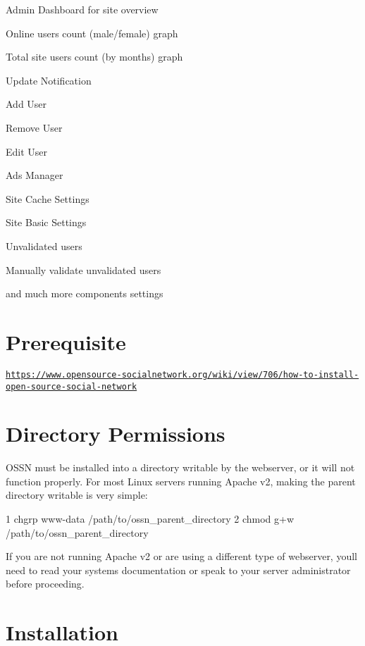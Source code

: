 \begin{DoxyItemize}
\item Admin Dashboard for site overview
\item Online users count (male/female) graph
\item Total site users count (by months) graph
\item Update Notification
\item Add User
\item Remove User
\item Edit User
\item Ads Manager
\item Site Cache Settings
\item Site Basic Settings
\item Unvalidated users
\item Manually validate unvalidated users
\item and much more components settings
\end{DoxyItemize}

\section*{Prerequisite }

\href{https://www.opensource-socialnetwork.org/wiki/view/706/how-to-install-open-source-social-network}{\tt https\+://www.\+opensource-\/socialnetwork.\+org/wiki/view/706/how-\/to-\/install-\/open-\/source-\/social-\/network}

\section*{Directory Permissions }

O\+S\+SN must be installed into a directory writable by the webserver, or it will not function properly. For most Linux servers running Apache v2, making the parent directory writable is very simple\+:


\begin{DoxyCode}
1 chgrp www-data /path/to/ossn\_parent\_directory
2 chmod g+w /path/to/ossn\_parent\_directory
\end{DoxyCode}


If you are not running Apache v2 or are using a different type of webserver, you\textquotesingle{}ll need to read your system\textquotesingle{}s documentation or speak to your server administrator before proceeding.

\section*{Installation }

